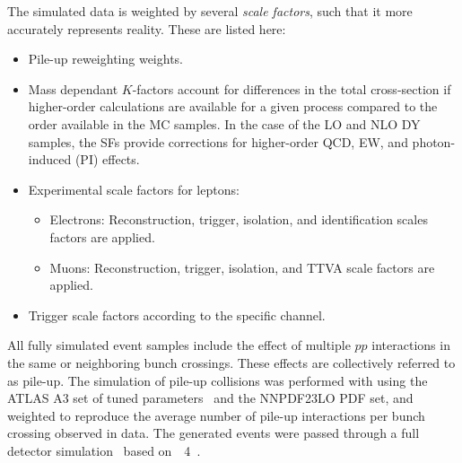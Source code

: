 The simulated data is weighted by several \emph{scale factors}, such that it more accurately represents reality.
These are listed here:
\begin{itemize}
	\item Pile-up reweighting weights.
	\item Mass dependant $K$-factors account for differences in the total cross-section if higher-order calculations are available for a given process compared to the order available in the MC samples. In the case of the LO and NLO DY samples, the SFs provide corrections for higher-order QCD, EW, and photon-induced (PI) effects.
	\item Experimental scale factors for leptons:
	\begin{itemize}
		\item Electrons: Reconstruction, trigger, isolation, and identification scales factors are applied.
		\item Muons: Reconstruction, trigger, isolation, and TTVA scale factors are applied.
	\end{itemize}
	\item Trigger scale factors according to the specific channel.
\end{itemize}

All fully simulated event samples include the effect of multiple $pp$ interactions in the same or neighboring bunch crossings.
These effects are collectively referred to as pile-up.
The simulation of pile-up collisions was performed with  using the ATLAS A3 set of tuned parameters~\cite{ATL-PHYS-PUB-2016-017} and the NNPDF23LO PDF set, and weighted to reproduce the average number of pile-up interactions per bunch crossing observed in data.
The generated events were passed through a full detector simulation~\cite{SOFT-2010-01} based on\ \GEANT~4~\cite{geant}.

